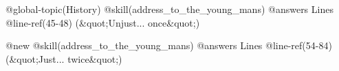 @global-topic(History)
@skill(address_to_the_young_mans)
@answers
Lines @line-ref(45-48) (&quot;Unjust... once&quot;)

@new
@skill(address_to_the_young_mans)
@answers
Lines @line-ref(54-84) (&quot;Just... twice&quot;)